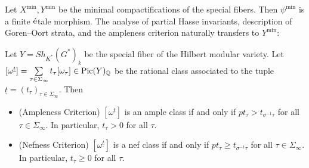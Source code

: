 \documentclass{article}
\begin{document}
Let $X^{\mathrm{min}},Y^{\mathrm{min}}$ be the minimal compactifications of the special fibers. Then $\psi^{\mathrm{min}}$ is a finite $\acute{\textnormal{e}}$tale morphism. The analyse of partial Hasse invariants,  description of Goren--Oort strata, and the ampleness criterion naturally transfers to $Y^{\mathrm{min}}$:

\begin{theorem}
	Let $Y=Sh_{K^\ast}(G^\ast)_k$ be the special fiber of the Hilbert modular variety. Let $[\omega^{\underline{t}}]=\sum\limits_{\tau\in\Sigma_\infty}t_\tau[\omega_\tau]\in\textnormal{Pic}(Y)_{\mathbb{Q}}$ be the rational class associated to the tuple $\underline{t}=(t_\tau)_{\tau\in\Sigma_{\infty}}$. Then
		\begin{itemize}
			\item (Ampleness Criterion) $[\omega^{\underline{t}}]$ is an ample class if and only if $pt_\tau>t_{\sigma^{-1}\tau}$ for all $\tau\in\Sigma_{\infty}$. In particular, $t_\tau>0$ for all $\tau$.
			\item (Nefness Criterion) $[\omega^{\underline{t}}]$ is a nef class if and only if $pt_\tau\ge t_{\sigma^{-1}\tau}$ for all $\tau\in\Sigma_{\infty}$. In particular, $t_\tau\ge0$ for all $\tau$.
		\end{itemize}
\end{theorem}








\end{document}
